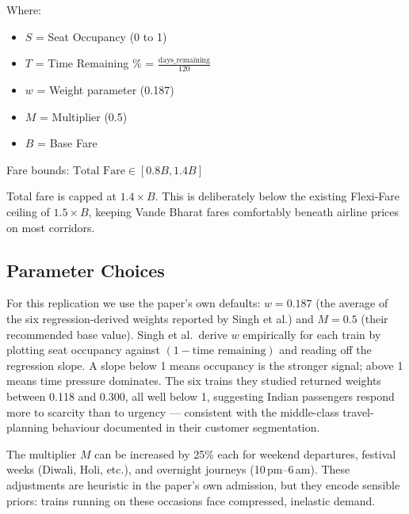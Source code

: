 \documentclass[10pt,a4paper]{article}
\begin{document}
Where:
\begin{itemize}
    \item $S$ = Seat Occupancy (0 to 1)
    \item $T$ = Time Remaining \% = $\frac{\text{days\_remaining}}{120}$
    \item $w$ = Weight parameter (0.187)
    \item $M$ = Multiplier (0.5)
    \item $B$ = Base Fare
\end{itemize}

Fare bounds: $\text{Total Fare} \in [0.8B, 1.4B]$

Total fare is capped at $1.4 \times B$. This is deliberately below the existing Flexi-Fare ceiling of $1.5 \times B$, keeping Vande Bharat fares comfortably beneath airline prices on most corridors.


\subsection{Parameter Choices}
 
For this replication we use the paper's own defaults: $w = 0.187$ (the average of the six regression-derived weights reported by Singh et al.) and $M = 0.5$ (their recommended base value). Singh et al.\ derive $w$ empirically for each train by plotting seat occupancy against $(1 - \text{time remaining})$ and reading off the regression slope. A slope below 1 means occupancy is the stronger signal; above 1 means time pressure dominates. The six trains they studied returned weights between 0.118 and 0.300, all well below 1, suggesting Indian passengers respond more to scarcity than to urgency --- consistent with the middle-class travel-planning behaviour documented in their customer segmentation.
 
The multiplier $M$ can be increased by 25\% each for weekend departures, festival weeks (Diwali, Holi, etc.), and overnight journeys (10\,pm--6\,am). These adjustments are heuristic in the paper's own admission, but they encode sensible priors: trains running on these occasions face compressed, inelastic demand.
 
\end{document}
